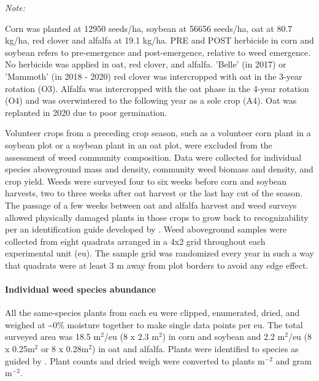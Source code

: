 \documentclass[
]{article}
\begin{document}
\begin{landscape}
\begin{table}
\begin{threeparttable}
\begin{tabular}[t]
\hline
\end{tabular}
\begin{tablenotes}[para]
\item \textit{Note: } 
\item Corn was planted at 12950 seeds/ha, soybean at 56656 seeds/ha, oat at 80.7 kg/ha, red clover and alfalfa at 19.1 kg/ha. PRE and POST herbicide in corn and soybean refers to pre-emergence and post-emergence, relative to weed emergence. No herbicide was applied in oat, red clover, and alfalfa. 'Belle' (in 2017) or 'Mammoth' (in 2018 - 2020) red clover was intercropped with oat in the 3-year rotation (O3). Alfalfa was intercropped with the oat phase in the 4-year rotation (O4) and was overwintered to the following year as a sole crop (A4). Oat was replanted in 2020 due to poor germination.
\end{tablenotes}
\end{threeparttable}
\end{table}
\end{landscape}

Volunteer crops from a preceding crop season, such as a volunteer corn plant in a soybean plot or a soybean plant in an oat plot, were excluded from the assessment of weed community composition. Data were collected for individual species aboveground mass and density, community weed biomass and density, and crop yield. Weeds were surveyed four to six weeks before corn and soybean harvests, two to three weeks after oat harvest or the last hay cut of the season.
The passage of a few weeks between oat and alfalfa harvest and weed surveys allowed physically damaged plants in those crops to grow back to recognizability per an identification guide developed by \citet{uvaWeedsNortheast1997}. Weed aboveground samples were collected from eight quadrats arranged in a 4x2 grid throughout each experimental unit (eu). The sample grid was randomized every year in such a way that quadrats were at least 3 m away from plot borders to avoid any edge effect.

\hypertarget{individual-weed-species-abundance}{%
\paragraph*{Individual weed species abundance}\label{individual-weed-species-abundance}}

All the same-species plants from each eu were clipped, enumerated, dried, and weighed at \textasciitilde0\% moisture together to make single data points per eu. The total surveyed area was 18.5 m\(^2\)/eu (8 x 2.3 m\(^2\)) in corn and soybean and 2.2 m\(^2\)/eu (8 x 0.25m\(^2\) or 8 x 0.28m\(^2\)) in oat and alfalfa. Plants were identified to species as guided by \citet{uvaWeedsNortheast1997}. Plant counts and dried weigh were converted to plants m\(^{-2}\) and gram m\(^{-2}\).
\end{document}
